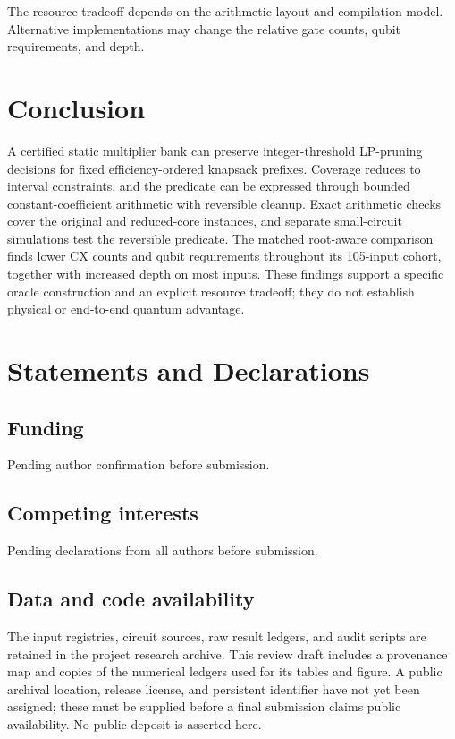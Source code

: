 \documentclass[referee,pdflatex,sn-mathphys-num]{sn-jnl}
\theoremstyle{thmstyleone}
\theoremstyle{thmstyletwo}
\begin{document}
The resource tradeoff depends on the arithmetic layout and compilation model. Alternative implementations may change the relative gate counts, qubit requirements, and depth.

\section{Conclusion}
A certified static multiplier bank can preserve integer-threshold LP-pruning decisions for fixed efficiency-ordered knapsack prefixes. Coverage reduces to interval constraints, and the predicate can be expressed through bounded constant-coefficient arithmetic with reversible cleanup. Exact arithmetic checks cover the original and reduced-core instances, and separate small-circuit simulations test the reversible predicate. The matched root-aware comparison finds lower CX counts and qubit requirements throughout its 105-input cohort, together with increased depth on most inputs. These findings support a specific oracle construction and an explicit resource tradeoff; they do not establish physical or end-to-end quantum advantage.

\backmatter
\section*{Statements and Declarations}
\subsection*{Funding}
Pending author confirmation before submission.
\subsection*{Competing interests}
Pending declarations from all authors before submission.
\subsection*{Data and code availability}
The input registries, circuit sources, raw result ledgers, and audit scripts are retained in the project research archive. This review draft includes a provenance map and copies of the numerical ledgers used for its tables and figure. A public archival location, release license, and persistent identifier have not yet been assigned; these must be supplied before a final submission claims public availability. No public deposit is asserted here.
\end{document}
